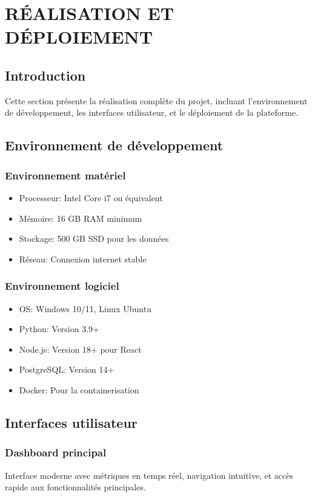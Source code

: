 \section{RÉALISATION ET DÉPLOIEMENT}

\subsection{Introduction}
Cette section présente la réalisation complète du projet, incluant l'environnement de développement, les interfaces utilisateur, et le déploiement de la plateforme.

\subsection{Environnement de développement}
\subsubsection{Environnement matériel}
\begin{itemize}
    \item Processeur: Intel Core i7 ou équivalent
    \item Mémoire: 16 GB RAM minimum
    \item Stockage: 500 GB SSD pour les données
    \item Réseau: Connexion internet stable
\end{itemize}

\subsubsection{Environnement logiciel}
\begin{itemize}
    \item OS: Windows 10/11, Linux Ubuntu
    \item Python: Version 3.9+
    \item Node.js: Version 18+ pour React
    \item PostgreSQL: Version 14+
    \item Docker: Pour la containerisation
\end{itemize}

\subsection{Interfaces utilisateur}
\subsubsection{Dashboard principal}
Interface moderne avec métriques en temps réel, navigation intuitive, et accès rapide aux fonctionnalités principales.

